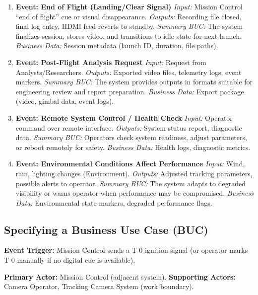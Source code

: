 \documentclass[12pt]{article}
\begin{document}
\begin{enumerate}[wide=0pt, leftmargin=*]
  \item \textbf{Event: End of Flight (Landing/Clear Signal)}
        \emph{Input:} Mission Control “end of flight” cue or visual disappearance.
        \emph{Outputs:} Recording file closed, final log entry, HDMI feed reverts
        to standby.
        \emph{Summary BUC:} The system finalizes session, stores video, and
        transitions to idle state for next launch.
        \emph{Business Data:} Session metadata (launch ID, duration, file paths).

  \item \textbf{Event: Post-Flight Analysis Request}
        \emph{Input:} Request from Analysts/Researchers.
        \emph{Outputs:} Exported video files, telemetry logs, event markers.
        \emph{Summary BUC:} The system provides outputs in formats suitable for
        engineering review and report preparation.
        \emph{Business Data:} Export package (video, gimbal data, event logs).

  \item \textbf{Event: Remote System Control / Health Check}
        \emph{Input:} Operator command over remote interface.
        \emph{Outputs:} System status report, diagnostic data.
        \emph{Summary BUC:} Operators check system readiness, adjust
        parameters, or reboot remotely for safety.
        \emph{Business Data:} Health logs, diagnostic metrics.

  \item \textbf{Event: Environmental Conditions Affect Performance}
        \emph{Input:} Wind, rain, lighting changes (Environment).
        \emph{Outputs:} Adjusted tracking parameters, possible alerts to operator.
        \emph{Summary BUC:} The system adapts to degraded visibility or warns
        operator when performance may be compromised.
        \emph{Business Data:} Environmental state markers, degraded performance
        flags.

\end{enumerate}

\subsection{Specifying a Business Use Case (BUC)}

\textbf{Event Trigger:} Mission Control sends a T-0 ignition signal
(or operator marks T-0 manually if no digital cue is available).

\textbf{Primary Actor:} Mission Control (adjacent system).
\textbf{Supporting Actors:} Camera Operator, Tracking Camera System (work boundary).
\end{document}
